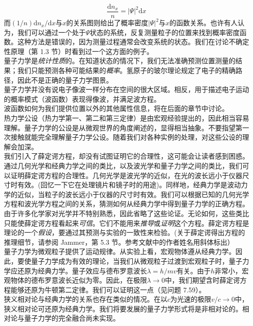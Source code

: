 	\begin{equation*}
		\frac{\mathrm{d}n_x}{n} = \left|\Psi\right|^2\mathrm{d}x
	\end{equation*}
	而$\left(1/n\right) \mathrm{d}n_x / \mathrm{d}x$与$x$的关系图则给出了概率密度$\left|\Psi\right|^2$与$x$的函数关系。也许有人认为，我们可以通过一个处于$\Psi$状态的系统，反复测量粒子的位置来找到概率密度函数。这种方法是错误的，因为测量过程通常会改变系统的状态。我们在讨论不确定性原理（第 1.3 节）时看到过一个这方面的例子。\\
	\indent 量子力学是\textit{统计性质}的。在知道状态的情况下，我们无法准确预测位置测量的结果；我们只能预测各种可能结果的\textit{概率}。氢原子的玻尔理论规定了电子的精确路径，因此不是正确的量子力学图景。\\
	\indent 量子力学并没有说电子像波一样分布在空间的很大区域。相反，用于描述电子运动的概率模式（波函数）表现得像波，并满足波方程。\\
	\indent 波函数如何为我们提供位置以外的其他属性信息，将在后面的章节中讨论。\\
	\indent 热力学公设（热力学第一、第二和第三定律）是由宏观经验提出的，因此相当容易理解。量子力学的公设是从微观世界的角度阐述的，显得相当抽象。不要指望第一次接触就能完全理解量子力学公设。随着我们对各种实例的处理，对这些公设的理解会加深。\\
	\indent 我们引入了薛定谔方程，却没有试图证明它的合理性，这可能会让读者感到困惑。通过几何光学和经典力学之间的类比，以及波光学和量子力学之间的类比，我们可以证明薛定谔方程的合理性。几何光学是波光学的近似，在光的波长远小于仪器尺寸时有效。(回忆一下它在处理镜片和镜子时的用途)。同样地，经典力学是波动力学的近似，当粒子的波长远小于仪器的尺寸时有效。我们可以根据已知的几何光学方程和波光学方程之间的关系，猜测如何从经典力学中得到量子力学的正确方程。由于许多化学家对光学并不特别熟悉，因此省略了这些论证。无论如何，这些类比只能使薛定谔方程看起来\textit{可信}。它们不能用来\textit{推导}或\textit{证明}这个方程。薛定谔方程是理论的一个\textit{假设}，要通过其预测与实验的一致性来检验。(关于薛定谔得出方程的推理细节，请参阅 Jammer，第 5.3 节。参考文献中的作者姓名用斜体标出）\\
	\indent 量子力学为微观粒子提供了运动规律。从实验上看，宏观物体遵从经典力学。因此，要使量子力学成为有效的理论，当我们从微观粒子过渡到宏观粒子时，量子力学应还原为经典力学。量子效应与德布罗意波长$\lambda=h/mv$有关。由于$h$非常小，宏观物体的德布罗意波长近似为零。因此，在极限$\lambda \rightarrow 0$中，我们期望含时薛定谔方程能够还原为牛顿第二定律。我们可以证明这一点（见问题 7.59）。\\
	\indent 狭义相对论与经典力学的关系也存在类似的情况。在以$c$为光速的极限$v/c \rightarrow 0$中，狭义相对论可还原为经典力学。我们将要发展的量子力学形式将是非相对论的。相对论与量子力学的完全融合尚未实现。\\
